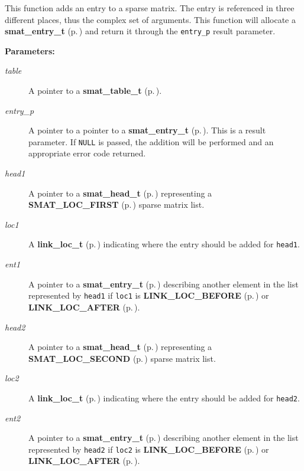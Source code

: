  This function adds an entry to a sparse matrix. The entry is referenced in three different places, thus the complex set of arguments. This function will allocate a {\bf smat\_\-entry\_\-t} {\rm (p.\,\pageref{group__dbprim__smat_a2})} and return it through the {\tt entry\_\-p} result parameter.\begin{Desc}
\item[{\bf Parameters: }]\par
\begin{description}
\item[
{\em table}]A pointer to a {\bf smat\_\-table\_\-t} {\rm (p.\,\pageref{group__dbprim__smat_a0})}. \item[
{\em entry\_\-p}]A pointer to a pointer to a {\bf smat\_\-entry\_\-t} {\rm (p.\,\pageref{group__dbprim__smat_a2})}. This is a result parameter. If {\tt NULL} is passed, the addition will be performed and an appropriate error code returned. \item[
{\em head1}]A pointer to a {\bf smat\_\-head\_\-t} {\rm (p.\,\pageref{group__dbprim__smat_a1})} representing a {\bf SMAT\_\-LOC\_\-FIRST} {\rm (p.\,\pageref{group__dbprim__smat_a48a102})} sparse matrix list. \item[
{\em loc1}]A {\bf link\_\-loc\_\-t} {\rm (p.\,\pageref{group__dbprim__link_a4})} indicating where the entry should be added for {\tt head1}. \item[
{\em ent1}]A pointer to a {\bf smat\_\-entry\_\-t} {\rm (p.\,\pageref{group__dbprim__smat_a2})} describing another element in the list represented by {\tt head1} if {\tt loc1} is {\bf LINK\_\-LOC\_\-BEFORE} {\rm (p.\,\pageref{group__dbprim__link_a26a100})} or {\bf LINK\_\-LOC\_\-AFTER} {\rm (p.\,\pageref{group__dbprim__link_a26a101})}. \item[
{\em head2}]A pointer to a {\bf smat\_\-head\_\-t} {\rm (p.\,\pageref{group__dbprim__smat_a1})} representing a {\bf SMAT\_\-LOC\_\-SECOND} {\rm (p.\,\pageref{group__dbprim__smat_a48a103})} sparse matrix list. \item[
{\em loc2}]A {\bf link\_\-loc\_\-t} {\rm (p.\,\pageref{group__dbprim__link_a4})} indicating where the entry should be added for {\tt head2}. \item[
{\em ent2}]A pointer to a {\bf smat\_\-entry\_\-t} {\rm (p.\,\pageref{group__dbprim__smat_a2})} describing another element in the list represented by {\tt head2} if {\tt loc2} is {\bf LINK\_\-LOC\_\-BEFORE} {\rm (p.\,\pageref{group__dbprim__link_a26a100})} or {\bf LINK\_\-LOC\_\-AFTER} {\rm (p.\,\pageref{group__dbprim__link_a26a101})}.\end{description}
\end{Desc}
